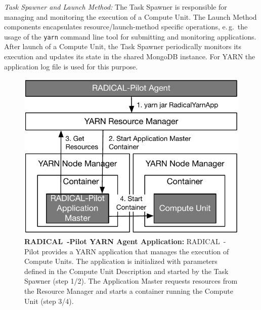 \emph{Task Spawner and Launch Method:}
The Task Spawner is responsible for managing and monitoring the execution of a Compute Unit.
The Launch Method components encapsulates resource/launch-method specific operations, e.\,g.\ the usage of the \texttt{yarn} command line tool for submitting and monitoring applications.
After launch of a Compute Unit, the Task Spawner periodically monitors its execution and updates its state in the shared MongoDB instance.
For YARN the application log file is used for this purpose.

\begin{figure}[t]
    \centering
    \includegraphics[width=.95\textwidth]{figures/data_analytics_hpc/hpc_hadoop/yarn.pdf}
    \caption{\textbf{RADICAL~-Pilot YARN Agent Application: }
        RADICAL~-Pilot provides a YARN application that manages the execution of Compute Units.
        The application is initialized with parameters defined in the Compute Unit Description and started by the Task Spawner (step 1/2).
        The Application Master requests resources from the Resource Manager and starts a container running the Compute Unit (step 3/4).}
    \label{fig:figures_yarn}
\end{figure}

